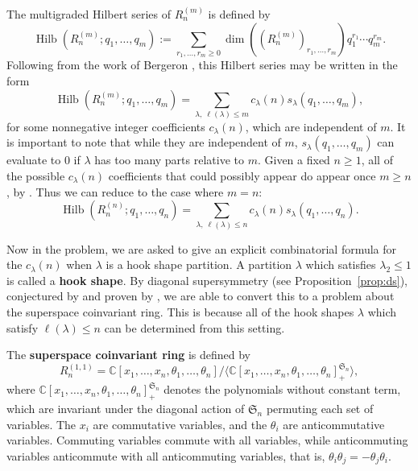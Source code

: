 \documentclass[11pt]{amsart}
\theoremstyle{definition}
\newcommand{\0}{\emptyset}
\newcommand{\C}{\mathbb{C}}
\DeclareMathOperator{\Hilb}{Hilb}
\begin{document}
The multigraded Hilbert series of $R_n^{(m)}$ is defined by 
\begin{equation} \Hilb(R_n^{(m)}; q_1,\ldots,q_m) := \sum_{r_1,\ldots,r_m \geq 0}\dim \left((R_n^{(m)})_{r_1,\ldots,r_m} \right)q_1^{r_1}\cdots q_m^{r_m}.\end{equation}
Following from the work of Bergeron \cite{Bergeron2020}, this Hilbert series may be written in the form
\begin{equation} \Hilb(R_n^{(m)}; q_1,\ldots,q_m) = \sum_{\lambda, \ \ell(\lambda) \leq m} c_\lambda(n) s_\lambda(q_1,\ldots,q_m),
\end{equation}
for some nonnegative integer coefficients $c_\lambda(n)$, which are independent of $m$. 
It is important to note that while they are independent of $m$, $s_\lambda(q_1,\ldots,q_m)$ can evaluate to $0$ if $\lambda$ has too many parts relative to $m$.
Given a fixed $n \geq 1$, all of the possible $c_\lambda(n)$ coefficients that could possibly appear do appear once $m \geq n$, by \cite{Bergeron2020}. Thus we can reduce to the case where $m=n$:
\begin{equation} \Hilb(R_n^{(n)}; q_1,\ldots,q_n) = \sum_{\lambda, \ \ell(\lambda) \leq n} c_\lambda(n) s_\lambda(q_1,\ldots,q_n).
\end{equation}

Now in the problem, we are asked to give an explicit combinatorial formula for the $c_\lambda(n)$ when $\lambda$ is a hook shape partition. 
A partition $\lambda$ which satisfies $\lambda_2 \leq 1$ is called a \textbf{hook shape}. 
By diagonal supersymmetry (see Proposition~\ref{prop:ds}), conjectured by \cite{Bergeron2020} and proven by \cite{Lentfer-Supersymmetry}, we are able to convert this to a problem about the superspace coinvariant ring. This is because all of the hook shapes $\lambda$ which satisfy $\ell(\lambda) \leq n$ can be determined from this setting.

The \textbf{superspace coinvariant ring} is defined by
\begin{equation}\label{eq:super-coinv} R_n^{(1,1)} = \C[x_1,\ldots,x_n, \theta_1, \ldots,\theta_n]/\langle \C[x_1,\ldots,x_n, \theta_1, \ldots,\theta_n]_+^{\mathfrak{S}_n} \rangle,\end{equation}
where $\C[x_1,\ldots,x_n, \theta_1, \ldots,\theta_n]_+^{\mathfrak{S}_n}$ denotes the polynomials without constant term, which are invariant under the diagonal action of $\mathfrak{S}_n$ permuting each set of variables.
The $x_i$ are commutative variables, and the $\theta_i$ are anticommutative variables.
Commuting variables commute with all variables, while anticommuting variables anticommute with all anticommuting variables, that is, $\theta_i\theta_j = -\theta_j \theta_i$.
\end{document}
